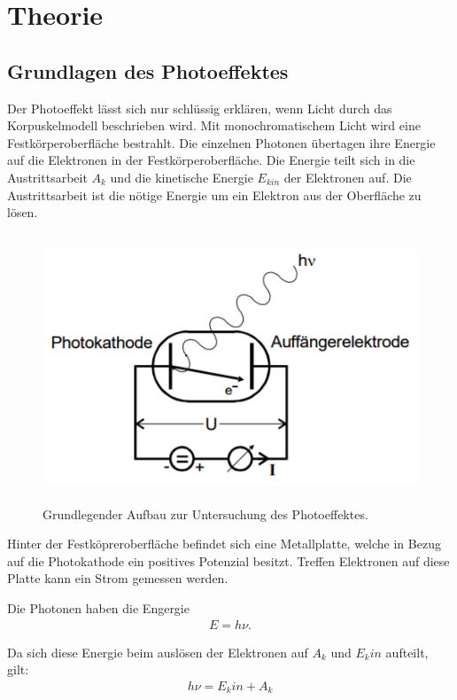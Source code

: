 \section{Theorie}
\label{sec:Theorie}

\cite{sample}

\subsection{Grundlagen des Photoeffektes}
Der Photoeffekt lässt sich nur schlüssig erklären, wenn Licht durch das Korpuskelmodell beschrieben wird.
Mit monochromatischem Licht wird eine Festkörperoberfläche bestrahlt. Die einzelnen Photonen
übertagen ihre Energie auf die Elektronen in der Festkörperoberfläche. Die Energie
teilt sich in die Austrittsarbeit $A_k$ und die kinetische Energie $E_{kin}$ der Elektronen auf.
Die Austrittsarbeit ist die nötige Energie um ein Elektron aus der Oberfläche zu lösen.

\begin{figure}[H]
  \centering
  \includegraphics[height=8cm]{anordnung.PNG}
  \caption{Grundlegender Aufbau zur Untersuchung des Photoeffektes. \cite{sample}}
  \label{fig:kathode}
\end{figure}

Hinter der Festköpreroberfläche befindet sich eine Metallplatte, welche in Bezug auf
die Photokathode ein positives Potenzial besitzt. Treffen Elektronen auf diese Platte
kann ein Strom gemessen werden.

Die Photonen haben die Engergie
\begin{align}
  E = h \nu.
\end{align}

Da sich diese Energie beim auslösen der Elektronen auf $A_k$ und $E_kin$ aufteilt, gilt:
\begin{align}
  h \nu = E_kin + A_k
\end{align}

